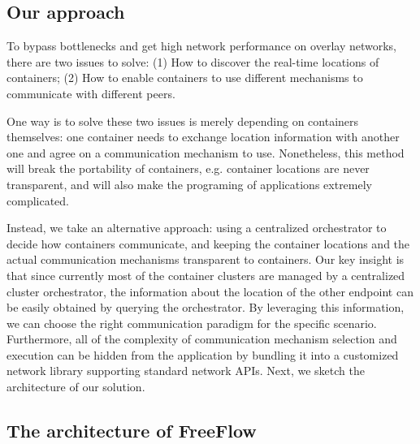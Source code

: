 \subsection{Our approach}

To bypass bottlenecks and get high network performance on overlay
networks, there are two issues to solve: (1) How to discover the real-time locations of containers; (2) How to enable containers
to use different mechanisms to communicate with different peers.

One way is to solve these two issues is merely depending on containers themselves:
one container needs to exchange location information with another one and
agree on a communication mechanism to use. Nonetheless, this method will 
break the portability of containers, e.g. container locations are never transparent, and will also make the programing of applications extremely 
complicated. 

Instead, we take an alternative approach: using a centralized orchestrator to decide how containers communicate, and keeping the container locations and the actual
communication mechanisms transparent to containers.
Our key insight is that since currently most of the container clusters are managed by a centralized cluster orchestrator, the information about the location of the other endpoint
can be easily obtained by querying the orchestrator. By leveraging this
information, we can choose the right communication paradigm for the specific
scenario. Furthermore, all of the complexity of communication mechanism selection
and execution can be hidden from the application
by bundling it into a customized network library supporting standard 
network APIs.
Next, we sketch the architecture of our solution.

\subsection{The architecture of FreeFlow}

